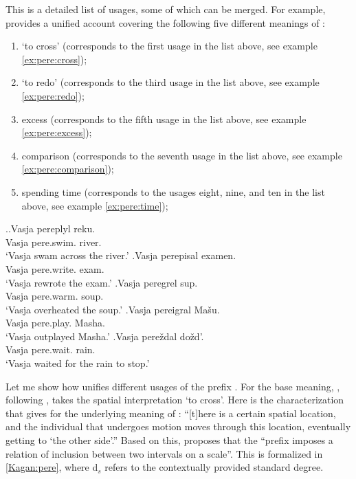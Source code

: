 This is a detailed list of  usages, some of which can be merged. For example, \citet[119--125]{Kagan:book} provides a unified account covering the following five different meanings of : 
\begin{enumerate}
\item `to cross' (corresponds to the first usage in the list above, see example \ref{ex:pere:cross});
\item `to redo' (corresponds to the third usage in the list above, see example \ref{ex:pere:redo});
\item excess (corresponds to the fifth usage in the list above, see example \ref{ex:pere:excess});
\item comparison (corresponds to the seventh usage in the list above, see example \ref{ex:pere:comparison});
\item spending time (corresponds to the usages eight, nine, and ten in the list above, see example \ref{ex:pere:time});
\end{enumerate}

\ex.\label{ex:pere}\ag.\label{ex:pere:cross}Vasja pereplyl reku.\\
Vasja pere.swim. river.\\
\trans `Vasja swam across the river.'
\bg.\label{ex:pere:redo}Vasja perepisal examen.\\
Vasja pere.write. exam.\\
\trans `Vasja rewrote the exam.'
\bg.\label{ex:pere:excess}Vasja peregrel sup.\\
Vasja pere.warm. soup.\\
\trans `Vasja overheated the soup.'
\bg.\label{ex:pere:comparison}Vasja pereigral Ma\v{s}u.\\
Vasja pere.play. Masha.\\
\trans `Vasja outplayed Masha.'
\bg.\label{ex:pere:time}Vasja pere\v{z}dal do\v{z}d'.\\
Vasja pere.wait. rain.\\
\trans `Vasja waited for the rain to stop.'

Let me show how \citet{Kagan:book} unifies different usages of the prefix . For the base meaning, \citet[120--121]{Kagan:book}, following \citet{Janda:88}, takes the spatial interpretation `to cross'. Here is the characterization that \citet[121]{Kagan:book} gives for the underlying meaning of : ``[t]here is a certain spatial location, and the individual that undergoes motion moves through this location, eventually getting to `the other side'.'' Based on this, \citet[122]{Kagan:book} proposes that the ``prefix imposes a relation of inclusion between two intervals on a scale''. This is formalized in \ref{Kagan:pere}, where d$_s$ refers to the contextually provided standard degree.

